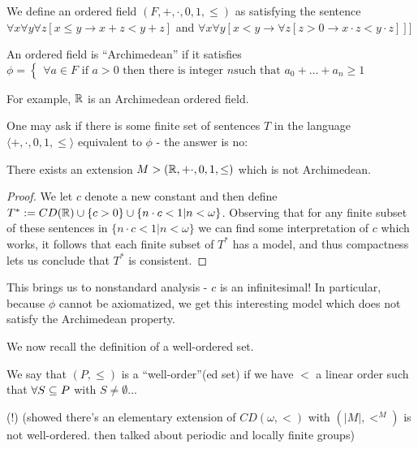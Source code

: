 \begin{boxdefinition}
    We define an ordered field $(F, +, \cdot, 0, 1, \leq)$ as satisfying the sentence $\forall x \forall y \forall z[x\leq y\rightarrow x+z<y+z]$ and $\forall x \forall y[x<y\rightarrow \forall z[z>0\rightarrow x\cdot z<y\cdot z]]]$
\end{boxdefinition}
\begin{boxdefinition}
    An ordered field is ``Archimedean'' if it satisfies $\phi=\begin{cases}
    \forall a \in F\text{ if }a>0\text{ then there is integer }n\text{such that }a_0+\ldots + a_n\geq 1\end{cases}$
\end{boxdefinition}

For example, $\mathbb{R}$ is an Archimedean ordered field.

One may ask if there is some finite set of sentences $T$ in the language $\langle +, \cdot, 0, 1, \leq\rangle$ equivalent to $\phi$ - the answer is no:

\begin{boxtheorem}
    There exists an extension $M>(\mathbb{R}, + \cdot, 0, 1, \leq)$ which is not Archimedean.
\end{boxtheorem}
\begin{proof}
    We let $c$ denote a new constant and then define $T^*:=CD(\mathbb{R})\cup \{c>0\}\cup\{n\cdot c<1|n<\omega\}$. Observing that for any finite subset of these sentences in $\{n\cdot c<1|n<\omega\}$ we can find some interpretation of $c$ which works, it follows that each finite subset of $T^*$ has a model, and thus compactness lets us conclude that $T^*$ is consistent.
\end{proof}
\begin{remark}
    This brings us to nonstandard analysis - $c$ is an infinitesimal! In particular, because $\phi$ cannot be axiomatized, we get this interesting model which does not satisfy the Archimedean property.
\end{remark}

We now recall the definition of a well-ordered set.
\begin{boxdefinition}
    We say that $(P, \leq)$ is a ``well-order''(ed set) if we have $<$ a linear order such that $\forall S\subseteq P$ with $S\neq \emptyset$...\sorry
\end{boxdefinition}
\sorry \sorry \sorry (!) (showed there's an elementary extension of $CD(\omega, <)$ with $(|M|, <^M)$ is not well-ordered. then talked about periodic and locally finite groups)